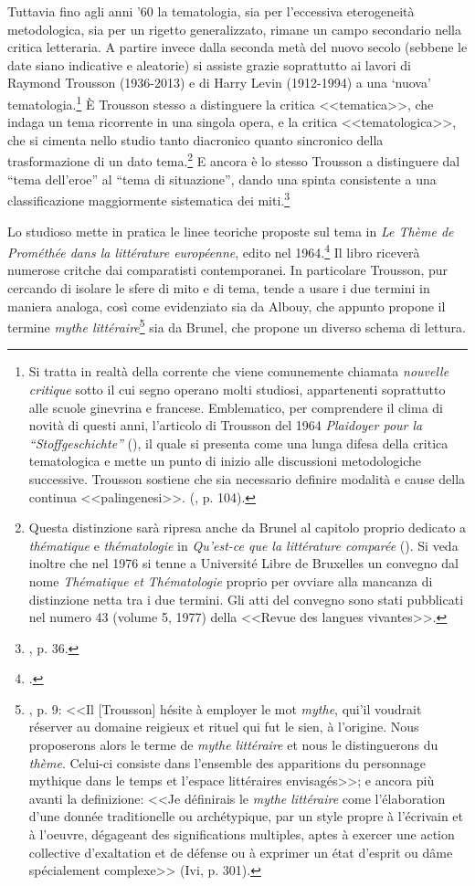 \documentclass[12pt,a4paper,openright, oneside]{book}
\begin{document}
Tuttavia fino agli anni '60 la tematologia, sia per l'eccessiva eterogeneità metodologica, sia per un rigetto generalizzato, rimane un campo secondario nella critica letteraria. A partire invece dalla seconda metà del nuovo secolo (sebbene le date siano indicative e aleatorie) si assiste grazie soprattutto ai lavori di Raymond Trousson (1936-2013) e di Harry Levin (1912-1994) a una `nuova' tematologia.\footnote{Si tratta in realtà della corrente che viene comunemente chiamata \textit{nouvelle critique} sotto il cui segno operano molti studiosi, appartenenti soprattutto alle scuole ginevrina e francese. Emblematico, per comprendere il clima di novità di questi anni, l'articolo di Trousson del 1964 \textit{Plaidoyer pour la ``Stoffgeschichte''} (\cite{Trousson1}), il quale si presenta come una lunga difesa della critica tematologica e mette un punto di inizio alle discussioni metodologiche successive. Trousson sostiene che sia necessario definire modalità e cause della continua <<palingenesi>>. (\cite{Trousson1}, p. 104).} È Trousson stesso a distinguere la critica <<tematica>>, che indaga un tema ricorrente in una singola opera, e la critica <<tematologica>>, che si cimenta nello studio tanto diacronico quanto sincronico della trasformazione di un dato tema.\footnote{Questa distinzione sarà ripresa anche da Brunel al capitolo proprio dedicato a \textit{thématique} e \textit{thématologie} in \textit{Qu'est-ce que la littérature comparée} (\cite{Brunel2}). Si veda inoltre che nel 1976 si tenne a Université Libre de Bruxelles un convegno dal nome \textit{Thématique et Thématologie} proprio per ovviare alla mancanza di distinzione netta tra i due termini. Gli atti del convegno sono stati pubblicati nel numero 43 (volume 5, 1977) della <<Revue des langues vivantes>>.} E ancora è lo stesso Trousson a distinguere dal ``tema dell'eroe'' al ``tema di situazione'', dando una spinta consistente a una classificazione maggiormente sistematica dei miti.\footnote{\cite{Trousson}, p. 36.} 

Lo studioso mette in pratica le linee teoriche proposte sul tema in \textit{Le Thème de Prométhée dans la littérature européenne}, edito nel 1964.\footnote{\cite{TroussonProm}.} Il libro riceverà numerose critche dai comparatisti contemporanei. In particolare Trousson, pur cercando di isolare le sfere di mito e di tema, tende a usare i due termini in maniera analoga, così come evidenziato sia da Albouy, che appunto propone il termine \textit{mythe littéraire}\footnote{\cite{Albouy}, p. 9: <<Il [Trousson] hésite à employer le mot \textit{mythe}, qui'il voudrait réserver au domaine reigieux et rituel qui fut le sien, à l'origine. Nous proposerons alors le terme de \textit{mythe littéraire} et nous le distinguerons du \textit{thème}. Celui-ci consiste dans l'ensemble des apparitions du personnage mythique dans le temps et l'espace littéraires envisagés>>; e ancora più avanti la definizione: <<Je définirais le \textit{mythe littéraire} come l'élaboration d'une donnée traditionelle ou archétypique, par un style propre à l'écrivain et à l'oeuvre, dégageant des significations multiples, aptes à exercer une action collective d'exaltation et de défense ou à exprimer un état d'esprit ou d\^ame spécialement complexe>> (Ivi, p. 301).} sia da Brunel, che propone un diverso schema di lettura.
\end{document}
